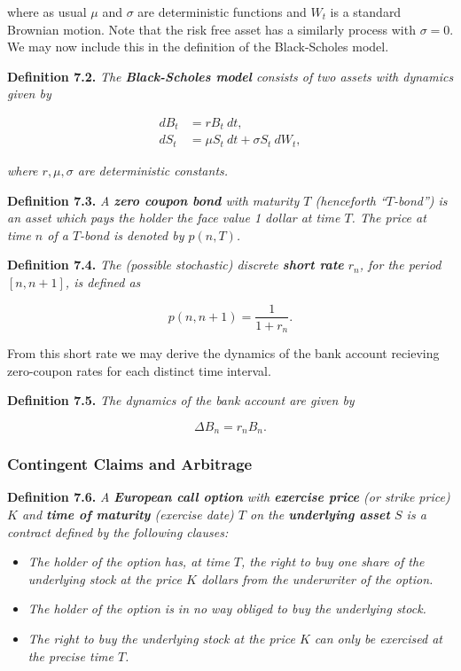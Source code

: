 \documentclass[
]{article}
\providecommand{\tightlist}{%
  \setlength{\itemsep}{0pt}\setlength{\parskip}{0pt}}
\begin{document}
where as usual \(\mu\) and \(\sigma\) are deterministic functions and
\(W_t\) is a standard Brownian motion. Note that the risk free asset has
a similarly process with \(\sigma = 0\). We may now include this in the
definition of the Black-Scholes model.

\textbf{Definition 7.2.} \emph{The \textbf{Black-Scholes model} consists
of two assets with dynamics given by}

\begin{align*}
dB_t&=rB_t\ dt,\tag{7.3}\\
dS_t&=\mu S_t\ dt+\sigma S_t\ dW_t,\tag{7.4}
\end{align*}

\emph{where \(r,\mu,\sigma\) are deterministic constants.}

\textbf{Definition 7.3.} \emph{A \textbf{zero coupon bond} with maturity
\(T\) (henceforth ``\(T\)-bond'') is an asset which pays the holder the
face value 1 dollar at time \(T\). The price at time \(n\) of a
\(T\)-bond is denoted by \(p(n,T)\).}

\textbf{Definition 7.4.} \emph{The (possible stochastic) discrete
\textbf{short rate} \(r_n\), for the period \([n,n+1]\), is defined as}

\[
p(n,n+1)=\frac{1}{1+ r_n}.\tag{7.6}
\]

From this short rate we may derive the dynamics of the bank account
recieving zero-coupon rates for each distinct time interval.

\textbf{Definition 7.5.} \emph{The dynamics of the bank account are
given by}

\[
\Delta B_n=r_n B_n.\tag{7.7}
\]

\hypertarget{contingent-claims-and-arbitrage}{%
\subsubsection{Contingent Claims and
Arbitrage}\label{contingent-claims-and-arbitrage}}

\textbf{Definition 7.6.} \emph{A \textbf{European call option} with
\textbf{exercise price} (or strike price) \(K\) and \textbf{time of
maturity} (exercise date) \(T\) on the \textbf{underlying asset} \(S\)
is a contract defined by the following clauses:}

\begin{itemize}
\tightlist
\item
  \emph{The holder of the option has, at time \(T\), the right to buy
  one share of the underlying stock at the price \(K\) dollars from the
  underwriter of the option.}
\item
  \emph{The holder of the option is in no way obliged to buy the
  underlying stock.}
\item
  \emph{The right to buy the underlying stock at the price \(K\) can
  only be exercised at the precise time \(T\).}
\end{itemize}
\end{document}
